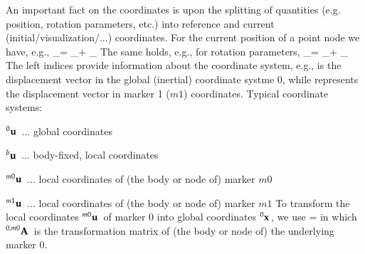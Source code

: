 \documentclass[11pt,a4paper]{book} %
\newcommand{\cRef}{_\mathrm{ref}} %
\newcommand{\cCur}{_\mathrm{cur}} %
\begin{document}
%
%
An important fact on the coordinates is upon the splitting of quantities (e.g. position, rotation parameters, etc.) into reference and current (initial/visualization/...) coordinates.
For the current position of a point node we have, e.g.,
\be
  \pv\cCur = \pv\cRef + \uv\cCur
\ee
The same holds, e.g., for rotation parameters,
\be
  \ttheta\cCur = \ttheta\cRef + \tpsi\cCur
\ee
%
\noindent The left indices provide information about the coordinate system, e.g.,
\be
\ee
is the displacement vector in the global (inertial) coordinate systme $0$, while 
\be
\ee
represents the displacement vector in marker 1 ($m1$) coordinates. Typical coordinate systems:
\bi
  \item $\prescript{0}{}{\mathbf{u}}\,$ $\ldots$ global coordinates
  \item $\prescript{b}{}{\mathbf{u}}\,$ $\ldots$ body-fixed, local coordinates
  \item $\prescript{m0}{}{\mathbf{u}}\,$ $\ldots$ local coordinates of (the body or node of) marker $m0$
  \item $\prescript{m1}{}{\mathbf{u}}\,$ $\ldots$ local coordinates of (the body or node of) marker $m1$
\ei
To transform the local coordinates $\prescript{m0}{}{\mathbf{u}}\,$ of marker 0 into global coordinates $\prescript{0}{}{\mathbf{x}}\,$, we use
\be
   =  
\ee
in which $\prescript{0,m0}{}{\mathbf{A}}\,$ is the transformation matrix of (the body or node of) the underlying marker 0.



\newpage
\end{document}
